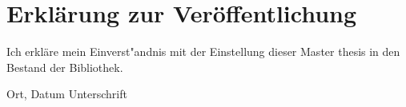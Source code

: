 \documentclass[12pt,final,twoside]{report}
\newcommand{\trtype}{Master thesis} %
\theoremstyle{plain}
\theoremstyle{definition}
\theoremstyle{remark}
\begin{document}
\vspace{2cm}
\chapter*{Erkl\"arung zur Ver\"offentlichung}
Ich erkl\"are mein Einverst"andnis mit der Einstellung dieser \trtype{} in den Bestand der Bibliothek.

\vspace{4cm}
\noindent Ort, Datum \hfill Unterschrift

\newpage
\thispagestyle{empty}
\hspace{1cm}
\newpage
\end{document}
